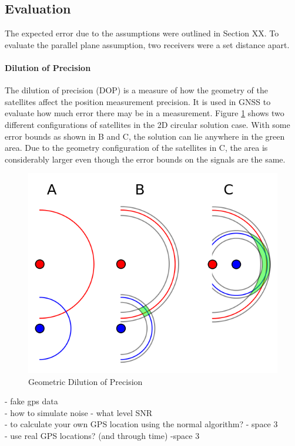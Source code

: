 \subsection{Evaluation} %
The expected error due to the assumptions were outlined in Section XX. To evaluate the parallel plane assumption, two receivers were a set distance apart.


\paragraph{Dilution of Precision}
The dilution of precision (DOP) is a measure of how the geometry of the satellites affect the position measurement precision. It is used in GNSS to evaluate how much error there may be in a measurement. Figure \ref{Fig: GDOP abstract} shows two different configurations of satellites in the 2D circular solution case. With some error bounds as shown in B and C, the solution can lie anywhere in the green area. Due to the geometry configuration of the satellites in C, the area is considerably larger even though the error bounds on the signals are the same.

\begin{figure}
\centering
\caption{Geometric Dilution of Precision}
\label{Fig: GDOP abstract}
\includegraphics[width=0.7\linewidth]{ChapterExperiments/Figures/GDOP.png}
\end{figure}




- fake gps data\\
- how to simulate noise - what level SNR\\
- to calculate your own GPS location using the normal algorithm? - space 3 \\
- use real GPS locations? (and through time) -space 3\\



